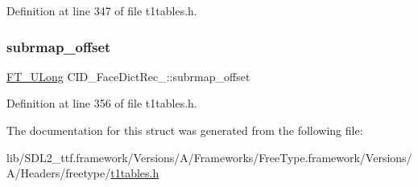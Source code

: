 Definition at line 347 of file t1tables.\+h.

\mbox{\label{struct_c_i_d___face_dict_rec___a45d58111727af70018289e7c5b64ba8c}} 
\subsubsection{\texorpdfstring{subrmap\_offset}{subrmap\_offset}}
{\footnotesize\ttfamily \mbox{\hyperlink{fttypes_8h_a4fac88bdba78eb76b505efa6e4fbf3f5}{F\+T\+\_\+\+U\+Long}} C\+I\+D\+\_\+\+Face\+Dict\+Rec\+\_\+\+::subrmap\+\_\+offset}



Definition at line 356 of file t1tables.\+h.



The documentation for this struct was generated from the following file\+:\begin{DoxyCompactItemize}
\item 
lib/\+S\+D\+L2\+\_\+ttf.\+framework/\+Versions/\+A/\+Frameworks/\+Free\+Type.\+framework/\+Versions/\+A/\+Headers/freetype/\mbox{\hyperlink{t1tables_8h}{t1tables.\+h}}\end{DoxyCompactItemize}
